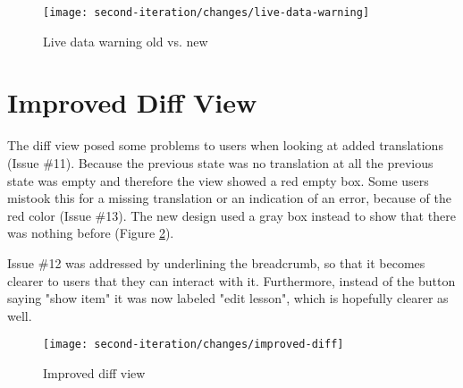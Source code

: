 


\begin{figure}[h!]
 \centering
 \texttt{[image: second-iteration/changes/live-data-warning]}
 \caption{Live data warning old vs. new}
 \label{fig:live-data-warning}
\end{figure}


\section{Improved Diff View}
The diff view posed some problems to users when looking at added translations (Issue \#11). Because the previous state was no translation at all the previous state was empty and therefore the view showed a red empty box. Some users mistook this for a missing translation or an indication of an error, because of the red color (Issue \#13). The new design used a gray box instead to show that there was nothing before (Figure \ref{fig:improved-diff-view}).

Issue \#12 was addressed by underlining the breadcrumb, so that it becomes clearer to users that they can interact with it. Furthermore, instead of the button saying "show item" it was now labeled "edit lesson", which is hopefully clearer as well.

\begin{figure}[h!]
 \centering
 \texttt{[image: second-iteration/changes/improved-diff]}
 \caption{Improved diff view}
 \label{fig:improved-diff-view}
\end{figure}


